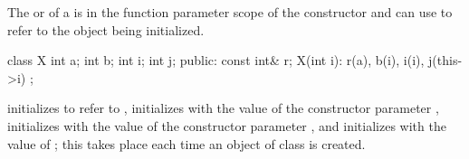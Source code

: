 \pnum
{}%
\begin{note}
The  or 
of a 
is in the function parameter scope of the constructor
and can use  to refer to the object being initialized.
\end{note}
\begin{example}
\begin{codeblock}
class X {
  int a;
  int b;
  int i;
  int j;
public:
  const int& r;
  X(int i): r(a), b(i), i(i), j(this->i) { }
};
\end{codeblock}

initializes
to refer to
,
initializes
with the value of the constructor parameter
,
initializes
with the value of the constructor parameter
,
and initializes
with the value of
;
this takes place each time an object of class
is created.
\end{example}


